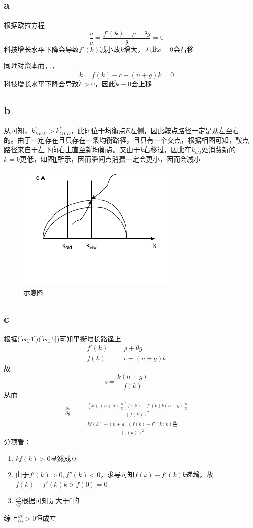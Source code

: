 \documentclass[a4paper,12pt]{ctexart}
\begin{document}
\subsection*{a}\label{sec:1}
根据欧拉方程
\begin{equation}
    \frac{\dot c}{c}=\frac{f'(k)-\rho-\theta g}{\theta}=0\label{eq:1}
\end{equation}
科技增长水平下降会导致$f'(k)$减小故$k$增大，因此$\dot c=0$会右移

同理对资本而言，
\begin{equation}
    \dot k=f(k)-c-(n+g)k=0\label{eq:2}
\end{equation}
科技增长水平下降会导致$\displaystyle \dot k>0$，因此$\dot k=0$会上移
\subsection*{b}
从可知，$k_{NEW}^*>k_{OLD}^*$，此时位于均衡点$E$左侧，因此鞍点路径一定是从左至右的。由于一定存在且只存在一条均衡路径，且只有一个交点，根据相图可知，鞍点路径来自于左下向右上直至新均衡点。又由于$\dot k$右移过，因此在$k_{old}$处消费新的$\dot k=0$更低，如图\ref{fig:1}所示，因而瞬间点消费一定会更小，因而会减小
\begin{figure}[H]
    \centering
    \includegraphics[trim=0 60 0 0,width=0.5\linewidth]{fig/fuck.drawio.png}
    \caption{示意图}\label{fig:1}
\end{figure}
\subsection*{c}
根据(\ref{eq:1})(\ref{eq:2})可知平衡增长路径上
\begin{eqnarray}
    f'(k)&=&\rho+\theta g \label{eq:4}\\
    f(k)&=&c+(n+g)k\label{eq:5}
\end{eqnarray}
故$$s=\frac{k(n+g)}{f(k)}$$
从而
\begin{eqnarray}
    \frac{\partial s}{\partial g}&=&\frac{(k+(n+g)\frac{\partial k}{\partial g})f(k)-f'(k)k(n+g)\frac{\partial k}{\partial g}}{(f(k))^2}\nonumber\\
    &=&\frac{kf(k)+(n+g)(f(k)-f'(k)k)\frac{\partial k}{\partial g}}{(f(k))^2}\label{eq:3}
\end{eqnarray}
分项看：
\begin{enumerate}
    \item $kf(k)>0$显然成立
    \item 由于$f'(k)>0,f''(k)<0$，求导可知$f(k)-f'(k)k$递增，故$f(k)-f'(k)k>f(0)=0$
    \item $\frac{\partial k}{\partial g}$根据可知是大于0的
\end{enumerate}
综上$\frac{\partial s}{\partial g}>0$恒成立
\end{document}
